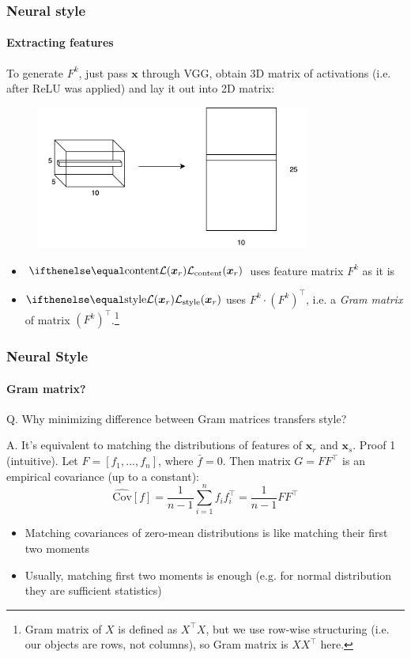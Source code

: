 \documentclass[10pt]{beamer}
\begin{document}
\begin{frame}
\frametitle{Neural style}
\framesubtitle{Extracting features}

To generate $F^k$, just pass $\bm x$ through VGG, obtain 3D matrix of activations (i.e. after ReLU was applied) and lay it out into 2D matrix:

\begin{figure}
    \centering
    \includegraphics[width=0.8\textwidth]{images/neural-style-feature-extraction}
\end{figure}


\begin{itemize}
    \item $\loss[\text{content}]{\bm x_r}$ uses feature matrix $F^k$ as it is
    \item $\loss[\text{style}]{\bm x_r}$ uses $F^k \cdot (F^k)^\top$, i.e. a \textit{Gram matrix} of matrix $(F^k)^\top$.\footnote{Gram matrix of $X$ is defined as $X^\top X$, but we use row-wise structuring (i.e. our objects are rows, not columns), so Gram matrix is $XX^\top$ here.}
\end{itemize}

\end{frame}


\begin{frame}
\frametitle{Neural Style}
\framesubtitle{Gram matrix?}
Q. Why minimizing difference between Gram matrices transfers style?

A. It's equivalent to matching the distributions of features of $\bm x_r$ and $\bm x_s$.
\bigbreak
Proof 1 (intuitive). Let $F = [f_1, ..., f_n]$, where $\bar{f} = 0$. Then matrix $G = FF^\top$ is an empirical covariance (up to a constant):
\[
\hat{\text{Cov}}[f] = \frac{1}{n-1}\sum_{i=1}^n f_if_i^\top = \frac{1}{n-1}FF^\top
\]

\begin{itemize}
    \item Matching covariances of zero-mean distributions is like matching their first two moments
    \item Usually, matching first two moments is enough (e.g. for normal distribution they are sufficient statistics)
\end{itemize}

\end{frame}
\end{document}
